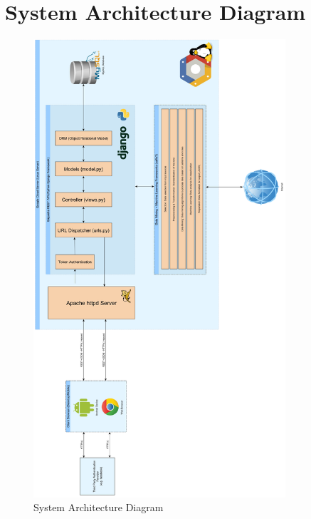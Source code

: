 \clearpage

\section{System Architecture Diagram}

\vfill

\begin{figure}
  \centering
  \begin{minipage}{140mm}
    \centering
    \includegraphics[height=170mm]{inc/architecture_diagram_rotate.jpg}
    \caption{System Architecture Diagram}
    \label{fig:architecture_diagram}
  \end{minipage}
\end{figure}

\vfill

